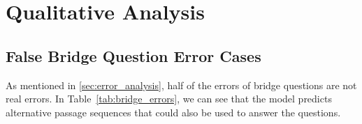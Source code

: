 \clearpage

\clearpage

\appendix
\section{Qualitative Analysis}

\subsection{False Bridge Question Error Cases}
\label{sec:false_errors}
As mentioned in \cref{sec:error_analysis}, half of the errors of bridge questions are not real errors. In Table~\ref{tab:bridge_errors}, we can see that the model predicts alternative passage sequences that could also be used to answer the questions.


